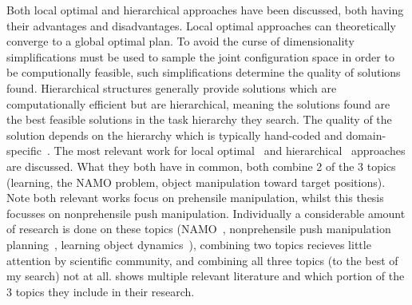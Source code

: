 Both local optimal and hierarchical approaches have been discussed, both having their advantages and disadvantages. Local optimal approaches can theoretically converge to a global optimal plan. To avoid the curse of dimensionality simplifications must be used to sample the joint configuration space in order to be computionally feasible, such simplifications determine the quality of solutions found. Hierarchical structures generally provide solutions which are computationally efficient but are hierarchical, meaning the solutions found are the best feasible solutions in the task hierarchy they search. The quality of the solution depends on the hierarchy which is typically hand-coded and domain-specific~\cite{vega-brown_asymptotically_2020}. The most relevant work for local optimal~\cite{sabbaghnovin_model_2021} and hierarchical~\cite{scholz_navigation_2016} approaches are discussed. What they both have in common, both combine 2 of the 3 topics (learning, the \ac{NAMO} problem, object manipulation toward target positions). Note both relevant works focus on prehensile manipulation, whilst this thesis focusses on nonprehensile push manipulation. Individually a considerable amount of research is done on these topics (\ac{NAMO}~\cite{wang_affordancebased_2020,lavalle_planning_2006,elbanhawi_samplingbased_2014,kingston_samplingbased_2018,chen_fast_2018,ellis_navigation_2022}, nonprehensile push manipulation planning~\cite{arruda_uncertainty_2017,mericli_pushmanipulation_2015,toussaint_sequenceofconstraints_2022,stuber_let_2020,stuber_featurebased_2018,bauza_dataefficient_2018}, learning object dynamics~\cite{seegmiller_vehicle_2013,cong_selfadapting_2020}), combining two topics recieves little attention by scientific community, and combining all three topics (to the best of my search) not at all.  shows multiple relevant literature and which portion of the 3 topics they include in their research.\bs

